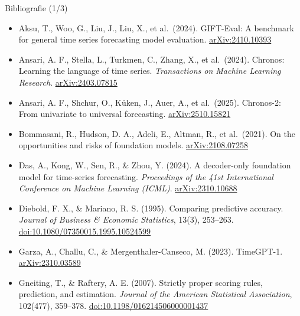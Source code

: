 \begin{frame}{Bibliografie (1/3)}
\itemsize{\scriptsize}
\begin{itemize}
    \item Aksu, T., Woo, G., Liu, J., Liu, X., et al.\ (2024). GIFT-Eval: A benchmark for general time series forecasting model evaluation. \href{https://arxiv.org/abs/2410.10393}{arXiv:2410.10393}
    \item Ansari, A. F., Stella, L., Turkmen, C., Zhang, X., et al.\ (2024). Chronos: Learning the language of time series. \textit{Transactions on Machine Learning Research}. \href{https://arxiv.org/abs/2403.07815}{arXiv:2403.07815}
    \item Ansari, A. F., Shchur, O., Küken, J., Auer, A., et al.\ (2025). Chronos-2: From univariate to universal forecasting. \href{https://arxiv.org/abs/2510.15821}{arXiv:2510.15821}
    \item Bommasani, R., Hudson, D. A., Adeli, E., Altman, R., et al.\ (2021). On the opportunities and risks of foundation models. \href{https://arxiv.org/abs/2108.07258}{arXiv:2108.07258}
    \item Das, A., Kong, W., Sen, R., \& Zhou, Y. (2024). A decoder-only foundation model for time-series forecasting. \textit{Proceedings of the 41st International Conference on Machine Learning (ICML)}. \href{https://arxiv.org/abs/2310.10688}{arXiv:2310.10688}
    \item Diebold, F. X., \& Mariano, R. S. (1995). Comparing predictive accuracy. \textit{Journal of Business \& Economic Statistics}, 13(3), 253--263. \href{https://doi.org/10.1080/07350015.1995.10524599}{doi:10.1080/07350015.1995.10524599}
    \item Garza, A., Challu, C., \& Mergenthaler-Canseco, M. (2023). TimeGPT-1. \href{https://arxiv.org/abs/2310.03589}{arXiv:2310.03589}
    \item Gneiting, T., \& Raftery, A. E. (2007). Strictly proper scoring rules, prediction, and estimation. \textit{Journal of the American Statistical Association}, 102(477), 359--378. \href{https://doi.org/10.1198/016214506000001437}{doi:10.1198/016214506000001437}
\end{itemize}
\end{frame}


